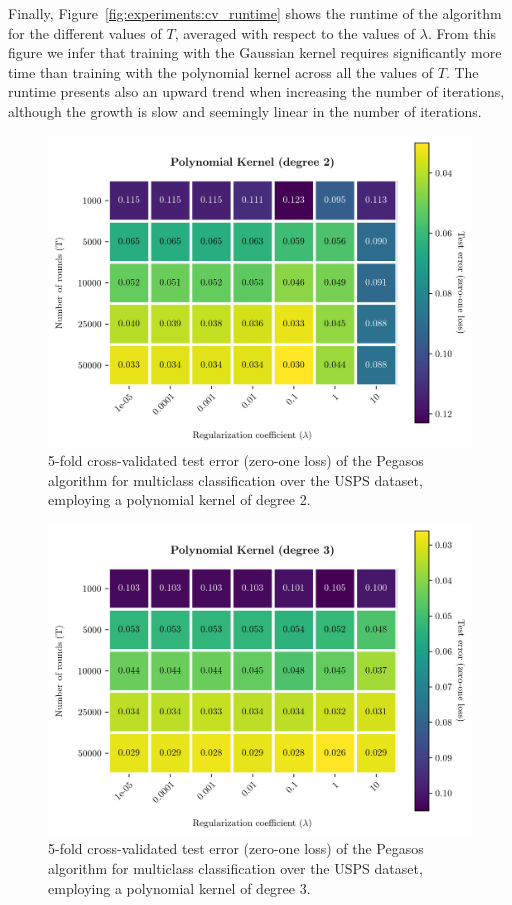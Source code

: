 \documentclass[runningheads]{llncs}
\begin{document}
Finally, Figure~\ref{fig:experiments:cv_runtime} shows the runtime of the algorithm for the different values of $T$, averaged with respect to the values of $\lambda$. From this figure we infer that training with the Gaussian kernel requires significantly more time than training with the polynomial kernel across all the values of $T$. The runtime presents also an upward trend when increasing the number of iterations, although the growth is slow and seemingly linear in the number of iterations. 

\begin{figure}
  \center
  \includegraphics[width=0.8\linewidth]{../img/poly_2_error.png}
  \caption{5-fold cross-validated test error (zero-one loss) of the Pegasos algorithm for multiclass classification over the USPS dataset, employing a polynomial kernel of degree 2.} 
  \label{fig:experiments:polynomial_2}
\end{figure}

\begin{figure}
  \center
  \includegraphics[width=0.8\linewidth]{../img/poly_3_error.png}
  \caption{5-fold cross-validated test error (zero-one loss) of the Pegasos algorithm for multiclass classification over the USPS dataset, employing a polynomial kernel of degree 3.} 
  \label{fig:experiments:polynomial_3}
\end{figure}
\end{document}
